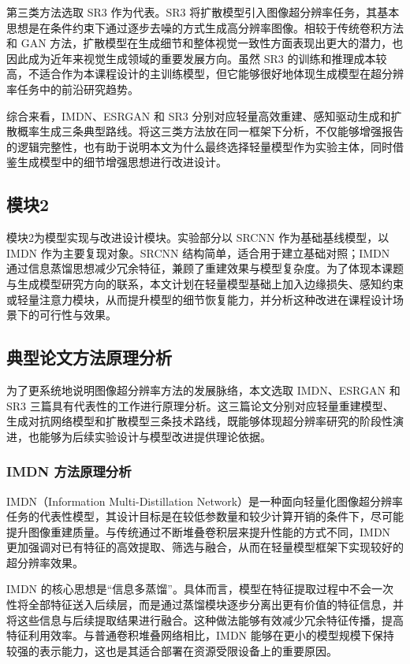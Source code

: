 \documentclass[bwprint]{report}
\begin{document}
第三类方法选取 SR3 作为代表。SR3 将扩散模型引入图像超分辨率任务，其基本思想是在条件约束下通过逐步去噪的方式生成高分辨率图像。相较于传统卷积方法和 GAN 方法，扩散模型在生成细节和整体视觉一致性方面表现出更大的潜力，也因此成为近年来视觉生成领域的重要发展方向。虽然 SR3 的训练和推理成本较高，不适合作为本课程设计的主训练模型，但它能够很好地体现生成模型在超分辨率任务中的前沿研究趋势。

综合来看，IMDN、ESRGAN 和 SR3 分别对应轻量高效重建、感知驱动生成和扩散概率生成三条典型路线。将这三类方法放在同一框架下分析，不仅能够增强报告的逻辑完整性，也有助于说明本文为什么最终选择轻量模型作为实验主体，同时借鉴生成模型中的细节增强思想进行改进设计。

\subsection{模块2}
模块2为模型实现与改进设计模块。实验部分以 SRCNN 作为基础基线模型，以 IMDN 作为主要复现对象。SRCNN 结构简单，适合用于建立基础对照；IMDN 通过信息蒸馏思想减少冗余特征，兼顾了重建效果与模型复杂度。为了体现本课题与生成模型研究方向的联系，本文计划在轻量模型基础上加入边缘损失、感知约束或轻量注意力模块，从而提升模型的细节恢复能力，并分析这种改进在课程设计场景下的可行性与效果。

\subsection{典型论文方法原理分析}
为了更系统地说明图像超分辨率方法的发展脉络，本文选取 IMDN、ESRGAN 和 SR3 三篇具有代表性的工作进行原理分析。这三篇论文分别对应轻量重建模型、生成对抗网络模型和扩散模型三条技术路线，既能够体现超分辨率研究的阶段性演进，也能够为后续实验设计与模型改进提供理论依据。

\subsubsection{IMDN 方法原理分析}
IMDN（Information Multi-Distillation Network）是一种面向轻量化图像超分辨率任务的代表性模型，其设计目标是在较低参数量和较少计算开销的条件下，尽可能提升图像重建质量。与传统通过不断堆叠卷积层来提升性能的方式不同，IMDN 更加强调对已有特征的高效提取、筛选与融合，从而在轻量模型框架下实现较好的超分辨率效果。

IMDN 的核心思想是“信息多蒸馏”。具体而言，模型在特征提取过程中不会一次性将全部特征送入后续层，而是通过蒸馏模块逐步分离出更有价值的特征信息，并将这些信息与后续提取结果进行融合。这种做法能够有效减少冗余特征传播，提高特征利用效率。与普通卷积堆叠网络相比，IMDN 能够在更小的模型规模下保持较强的表示能力，这也是其适合部署在资源受限设备上的重要原因。
\end{document}

